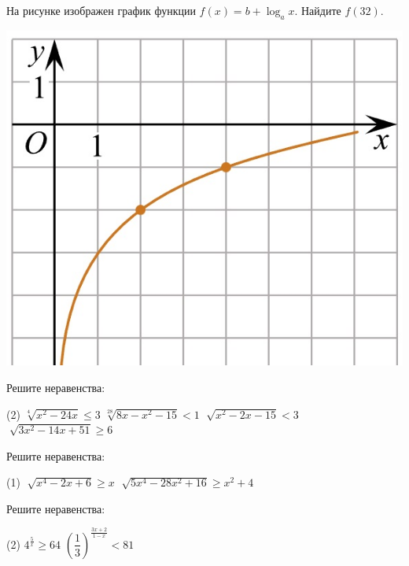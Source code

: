 \begin{class}[number=1]
\begin{listofex}
\begin{minipage}[t]{\picwidth}
		\end{minipage}
		\item %
		\begin{minipage}[t]{\bodywidth}
			На рисунке изображен график функции \(f(x) = b+\log_ax \). Найдите \(f(32)\).
		\end{minipage}
		\hspace{0.02\linewidth}
		\begin{minipage}[t]{\picwidth}
			\includegraphics[align=t, width=\linewidth]{../pics/G111M8L1-1}
		\end{minipage}
		\item Решите неравенства: %
		\begin{tasks}(2)
			\task \( \sqrt[4]{x^2-24x} \le 3 \)
			\task \( \sqrt[28]{8x-x^2-15} < 1 \)
			\task \( \sqrt[]{x^2-2x-15} < 3 \)
			\task \( \sqrt[]{3x^2-14x+51} \ge 6 \)
		\end{tasks}
		\item Решите неравенства:
		\begin{tasks}(1)
			\task \( \sqrt[]{x^4-2x+6} \ge x \)
			\task \( \sqrt[]{5x^4-28x^2+16} \ge x^2+4 \)
		\end{tasks}
		\newpage
		\item Решите неравенства: %
		\begin{tasks}(2)
			\task \( 4^{\tfrac{5}{x}} \ge 64 \)
			\task \( \left( \dfrac{ 1 }{ 3 } \right)^{\tfrac{ 3x+2 }{ 1-x }} < 81 \)
			

\end{tasks}
\end{listofex}
\end{class}
